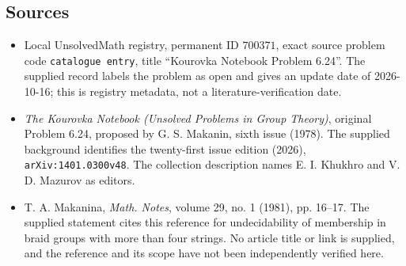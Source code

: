 \documentclass[11pt]{article}
\begin{document}
\subsection{Sources}
\begin{itemize}
\item Local UnsolvedMath registry, permanent ID \(700371\), exact source problem code \texttt{catalogue entry}, title ``Kourovka Notebook Problem 6.24''. The supplied record labels the problem as open and gives an update date of 2026-10-16; this is registry metadata, not a literature-verification date.
\item \emph{The Kourovka Notebook (Unsolved Problems in Group Theory)}, original Problem 6.24, proposed by G. S. Makanin, sixth issue (1978). The supplied background identifies the twenty-first issue edition (2026), \texttt{arXiv:1401.0300v48}. The collection description names E. I. Khukhro and V. D. Mazurov as editors.
\item T. A. Makanina, \emph{Math. Notes}, volume 29, no. 1 (1981), pp. 16--17. The supplied statement cites this reference for undecidability of membership in braid groups with more than four strings. No article title or link is supplied, and the reference and its scope have not been independently verified here.
\end{itemize}
\end{document}

